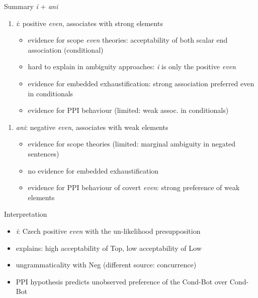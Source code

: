 \documentclass[ignorenonframetext,]{beamer}
\providecommand{\tightlist}{%
  \setlength{\itemsep}{0pt}\setlength{\parskip}{0pt}}
\begin{document}
\begin{frame}{Summary \emph{i} + \emph{ani}}

\begin{enumerate}
\def\labelenumi{\arabic{enumi})}
\tightlist
\item
  \emph{i}: positive \emph{even}, associates with strong elements

  \begin{itemize}
  \tightlist
  \item
    evidence for scope \emph{even} theories: acceptability of both
    scalar end association (conditional)
  \item
    hard to explain in ambiguity approaches: \emph{i} is only the
    positive \emph{even}
  \item
    evidence for embedded exhaustification: strong association preferred
    even in conditionals
  \item
    evidence for PPI behaviour (limited: weak assoc. in conditionals)
  \end{itemize}
\end{enumerate}

\end{frame}

\begin{frame}

\begin{enumerate}
\def\labelenumi{\arabic{enumi})}
\setcounter{enumi}{1}
\tightlist
\item
  \emph{ani}: negative \emph{even}, associates with weak elements

  \begin{itemize}
  \tightlist
  \item
    evidence for scope theories (limited: marginal ambiguity in negated
    sentences)
  \item
    no evidence for embedded exhaustification
  \item
    evidence for PPI behaviour of covert \emph{even}: strong preference
    of weak elements
  \end{itemize}
\end{enumerate}

\end{frame}

\begin{frame}{Interpretation}

\begin{itemize}
\tightlist
\item
  \emph{i}: Czech positive \emph{even} with the un-likelihood
  presupposition
\item
  explains: high acceptability of Top, low acceptability of Low
\item
  ungrammaticality with Neg (different source: concurrence)
\item
  PPI hypothesis predicts unobserved preference of the Cond-Bot over
  Cond-Bot
\end{itemize}

\end{frame}
\end{document}
